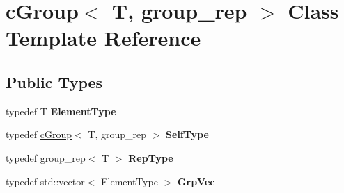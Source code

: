 \hypertarget{classcGroup}{
\section{c\-Group$<$ \-T, group\-\_\-rep $>$ \-Class \-Template \-Reference}
\label{classcGroup}
}
\subsection*{\-Public \-Types}
\begin{DoxyCompactItemize}
\item 
\hypertarget{classcGroup_abf5ed8f308bc05dbbb75b1f2ccb3bf18}{
typedef \-T {\bfseries \-Element\-Type}}
\label{classcGroup_abf5ed8f308bc05dbbb75b1f2ccb3bf18}

\item 
\hypertarget{classcGroup_a8c16d6d9eb0d68d286505528c1e94d3a}{
typedef \hyperlink{classcGroup}{c\-Group}$<$ \-T, group\-\_\-rep $>$ {\bfseries \-Self\-Type}}
\label{classcGroup_a8c16d6d9eb0d68d286505528c1e94d3a}

\item 
\hypertarget{classcGroup_a8752843a8e5c6d23411de90d4e1a1f51}{
typedef group\-\_\-rep$<$ \-T $>$ {\bfseries \-Rep\-Type}}
\label{classcGroup_a8752843a8e5c6d23411de90d4e1a1f51}

\item 
\hypertarget{classcGroup_aa233178cfb06c6c59df798ff40fce156}{
typedef std\-::vector$<$ \-Element\-Type $>$ {\bfseries \-Grp\-Vec}}
\label{classcGroup_aa233178cfb06c6c59df798ff40fce156}

\end{DoxyCompactItemize}
